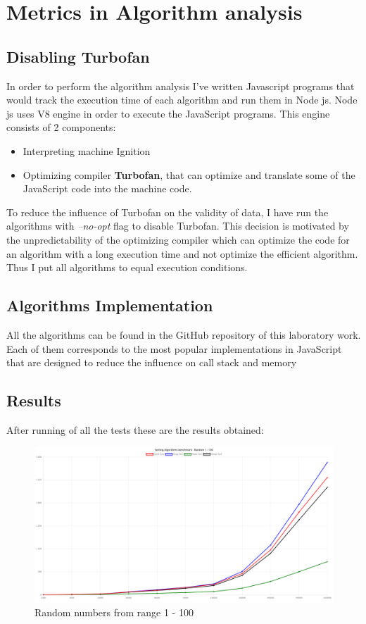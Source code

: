 \documentclass[12pt]{article}
\begin{document}
\clearpage
\section*{Metrics in Algorithm analysis}

\subsection*{Disabling Turbofan}
In order to perform the algorithm analysis I've written Javascript programs that would track the execution time of each algorithm
and run them in Node js. Node js uses V8 engine in order to execute the JavaScript programs. This engine consists of 2 components:
\begin{itemize}
  \item Interpreting machine Ignition
  \item Optimizing compiler \textbf{Turbofan}, that can optimize and translate some of the JavaScript code into the machine code.

\end{itemize}
To reduce the influence of Turbofan on the validity of data, 
I have run the algorithms with \textit{--no-opt} flag to disable Turbofan.
This decision is motivated by the unpredictability of the optimizing compiler which can 
optimize the code for an algorithm with a long execution time and not optimize the efficient algorithm.
Thus I put all algorithms to equal execution conditions.

\subsection*{Algorithms Implementation}
All the algorithms can be found in the GitHub\cite{github} repository of this laboratory
work. Each of them corresponds to the most popular implementations in JavaScript
that are designed to reduce the influence on call stack and memory

\subsection*{Results}
After running of all the tests these are the results obtained:
\begin{figure}[h]
    \centering
    \includegraphics[width=1\textwidth]{random100.png}
    \caption{Random numbers from range 1 - 100}
    \label{fig:rand100}
\end{figure}
\end{document}
